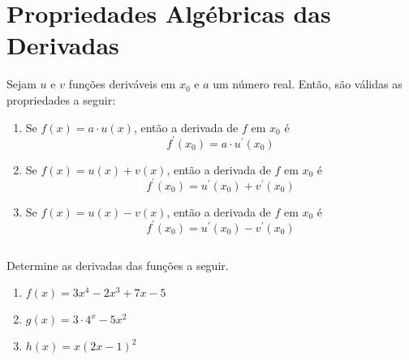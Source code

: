 \section{Propriedades Algébricas das Derivadas}
\begin{frame}
  \begin{theorem}
    Sejam $u$ e $v$ funções deriváveis em $x_{0}$ e $a$ um número real. Então, são válidas as propriedades a seguir:
    \begin{enumerate}
      \item Se $f(x) = a\cdot u(x)$, então a derivada de $f$ em $x_{0}$ é
      \begin{equation*}
        f^{\prime}(x_{0}) = a\cdot u^{\prime}(x_{0})
      \end{equation*}
      \item Se $f(x) = u(x) + v(x)$, então a derivada de $f$ em $x_{0}$ é
      \begin{equation*}
        f^{\prime}(x_{0}) = u^{\prime}(x_{0}) + v^{\prime}(x_{0})
      \end{equation*}
      \item Se $f(x) = u(x) - v(x)$, então a derivada de $f$ em $x_{0}$ é
      \begin{equation*}
        f^{\prime}(x_{0}) = u^{\prime}(x_{0}) - v^{\prime}(x_{0})
      \end{equation*}
    \end{enumerate}
  \end{theorem}
\end{frame}

\begin{frame}
  \begin{columns}[onlytextwidth]
    \begin{column}{0.55\textwidth}\vspace{-0.5cm}
      \begin{example}
        Determine as derivadas das funções a seguir.
        \begin{enumerate}
          \item $f(x) = 3x^{4} - 2x^{3} + 7x - 5$
          \item $g(x) = 3\cdot 4^{x} - 5x^2$
          \item $h(x) = x(2x-1)^{2}$
        \end{enumerate}
      \end{example}
    \end{column}
    \begin{column}{0.43\textwidth}\vspace{-0.5cm}
    \end{column}
  \end{columns}
\end{frame}


